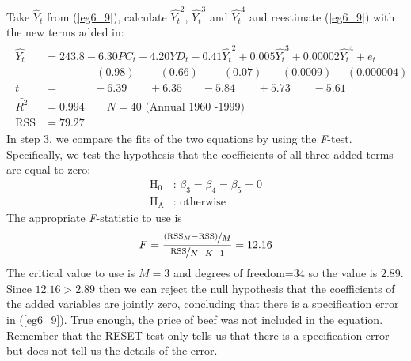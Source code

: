 \documentclass[11pt]{article}
\begin{document}
Take $\hat{Y}_t$ from (\ref{eg6_9}), calculate $\hat{Y_t}^2$, $\hat{Y_t}^3$ and $\hat{Y_t}^4$ and reestimate (\ref{eg6_9}) with the new terms added in:
\begin{align}
\label{eg6_28}
\begin{split}
\hat{Y_t} &= 243.8 - {6.30PC_t} + {4.20YD_t} - 0.41\hat{Y_t}^2 + 0.005\hat{Y_t}^3 + 0.00002\hat{Y_t}^4 + e_t\\
&\>\>\>\>\>\>\>\>\>\>\>\>\>\>\>\>\>\>\>\>\> (0.98) 
\>\>\>\>\>\>\>\>\>\> (0.66)
\>\>\>\>\>\>\>\>\>\> (0.07)
\>\>\>\>\>\>\>\> (0.0009)
\>\>\>\>\>\> (0.000004)\\
t&=\>\>\>\>\>\>\>\>\>\>\>\>\>\> -6.39 
\>\>\>\>\>\>\>\>\> +6.35
\>\>\>\>\>\>\>\> -5.84
\>\>\>\>\>\>\>\>\> +5.73
\>\>\>\>\>\>\>\>\> -5.61\\
\bar{R^2}&= 0.994 \quad\quad N=40 \text{  (Annual 1960 -1999)}\\
\text{RSS} &= 79.27
\end{split}
\end{align}
In step 3, we compare the fits of the two equations by using the \textit{F}-test. Specifically, we test the hypothesis that the coefficients of all three added terms are equal to zero:
\begin{align*}
 \text{H}_0 & \text{: }\beta_3 = \beta_4 = \beta_5=0\\ \text{H}_\text{A} & \text{: } \text{otherwise}
\end{align*}
The appropriate \textit{F}-statistic to use is
\begin{equation}
F = \frac{\nicefrac{(\text{RSS}_M-\text{RSS})}{M}}{\nicefrac{\text{RSS}}{N-K-1}} = 12.16
\label{eg6_29}
\end{equation}
The critical value to use is $M=3$ and degrees of freedom=$34$ so the value is $2.89$. Since $12.16>2.89$ then we can reject the null hypothesis that the coefficients of the added variables are jointly zero, concluding that there is a specification error in (\ref{eg6_9}). True enough, the price of beef was not included in the equation. Remember that the RESET test only tells us that there is a specification error but does not tell us the details of the error.
\end{document}
